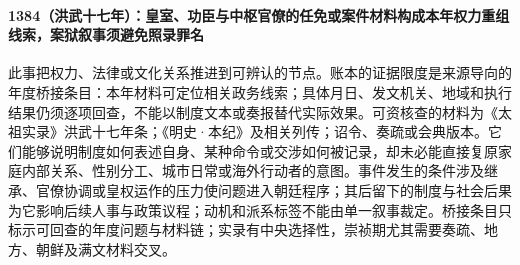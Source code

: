 \paragraph{1384（洪武十七年）：皇室、功臣与中枢官僚的任免或案件材料构成本年权力重组线索，案狱叙事须避免照录罪名} 此事把权力、法律或文化关系推进到可辨认的节点。账本的证据限度是来源导向的年度桥接条目：本年材料可定位相关政务线索；具体月日、发文机关、地域和执行结果仍须逐项回查，不能以制度文本或奏报替代实际效果。可资核查的材料为《太祖实录》洪武十七年条；《明史·本纪》及相关列传；诏令、奏疏或会典版本。它们能够说明制度如何表述自身、某种命令或交涉如何被记录，却未必能直接复原家庭内部关系、性别分工、城市日常或海外行动者的意图。事件发生的条件涉及继承、官僚协调或皇权运作的压力使问题进入朝廷程序；其后留下的制度与社会后果为它影响后续人事与政策议程；动机和派系标签不能由单一叙事裁定。桥接条目只标示可回查的年度问题与材料链；实录有中央选择性，崇祯期尤其需要奏疏、地方、朝鲜及满文材料交叉。
